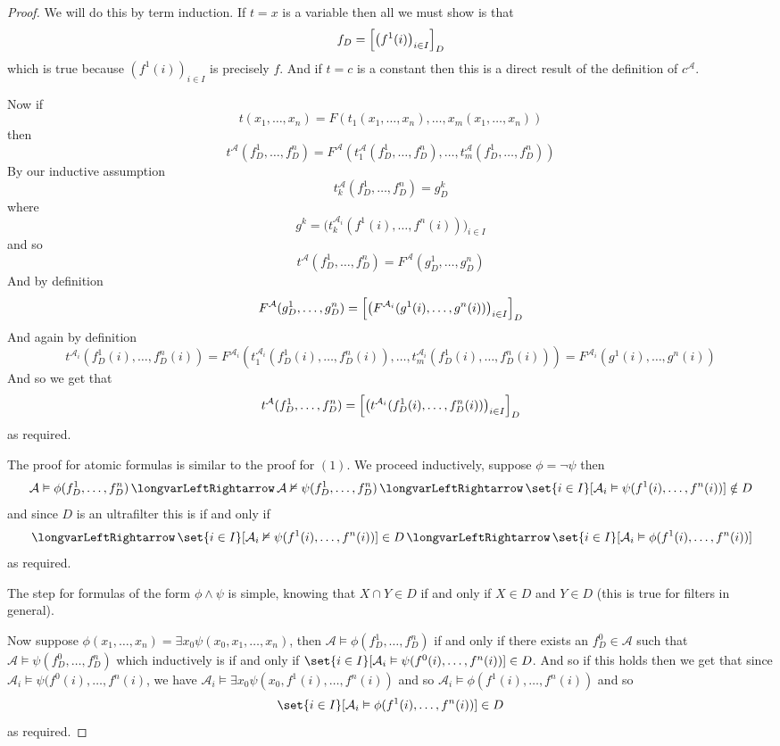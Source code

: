 \documentclass[10pt]{article}
\def\iff{\,\longvarLeftRightarrow\,}
\def\mA{\mathcal{A}}
\begin{document}
\begin{proof}

    \benum
        \item We will do this by term induction.
        If $t=x$ is a variable then all we must show is that
        \[ f_D = \Bigl[\bigl(f^1(i)\bigr)_{i\in I}\Bigr]_D \]
        which is true because $(f^1(i))_{i\in I}$ is precisely $f$.
        And if $t=c$ is a constant then this is a direct result of the definition of $c^\mA$.

        Now if
        \[ t(x_1,\dots,x_n) = F(t_1(x_1,\dots,x_n),\dots,x_m(x_1,\dots,x_n)) \]
        then
        \[ t^\mA(f^1_D,\dots,f^n_D) = F^\mA(t_1^\mA(f_D^1,\dots,f_D^n),\dots,t_m^\mA(f_D^1,\dots,f_D^n)) \]
        By our inductive assumption
        \[ t_k^\mA(f_D^1,\dots,f_D^n) = g^k_D \]
        where
        \[ g^k = \bigl(t_k^{\mA_i}(f^1(i),\dots,f^n(i))\bigr)_{i\in I} \]
        and so
        \[ t^\mA(f^1_D,\dots,f^n_D) = F^\mA(g_D^1,\dots,g_D^n) \]
        And by definition
        \[ F^\mA(g_D^1,\dots,g_D^n) = \Bigl[\bigl(F^{\mA_i}(g^1(i),\dots,g^n(i))\bigr)_{i\in I}\Bigr]_D \]
        And again by definition
        \[ t^{\mA_i}(f_D^1(i),\dots,f_D^n(i)) = F^{\mA_i}(t_1^{\mA_i}(f_D^1(i),\dots,f_D^n(i)),\dots,t_m^{\mA_i}(f_D^1(i),\dots,f_D^n(i))) = F^{\mA_i}(g^1(i),\dots,g^n(i)) \]
        And so we get that
        \[ t^\mA(f^1_D,\dots,f^n_D) = \Bigl[\bigl(t^{\mA_i}(f_D^1(i),\dots,f_D^n(i))\bigr)_{i\in I}\Bigr]_D \]
        as required.

        \item The proof for atomic formulas is similar to the proof for $(1)$.
        We proceed inductively, suppose $\phi=\neg\psi$ then
        \[ \mA\vDash\phi(f^1_D,\dots,f^n_D) \iff \mA\nvDash\psi(f^1_D,\dots,f^n_D) \iff \set{i\in I}[\mA_i\vDash\psi(f^1(i),\dots,f^n(i))] \notin D \]
        and since $D$ is an ultrafilter this is if and only if
        \[ \iff \set{i\in I}[\mA_i\nvDash\psi(f^1(i),\dots,f^n(i))] \in D \iff \set{i\in I}[\mA_i\vDash\phi(f^1(i),\dots,f^n(i))] \]
        as required.

        The step for formulas of the form $\phi\land\psi$ is simple, knowing that $X\cap Y\in D$ if and only if $X\in D$ and $Y\in D$ (this is true for filters in general).

        Now suppose $\phi(x_1,\dots,x_n)=\exists x_0\psi(x_0,x_1,\dots,x_n)$, then $\mA\vDash\phi(f^1_D,\dots,f^n_D)$ if and only if there exists an $f^0_D\in\mA$ such that
        $\mA\vDash\psi(f^0_D,\dots,f^n_D)$ which inductively is if and only if $\set{i\in I}[\mA_i\vDash\psi(f^0(i),\dots,f^n(i))]\in D$.
        And so if this holds then we get that since $\mA_i\vDash\psi(f^0(i),\dots,f^n(i)$, we have $\mA_i\vDash\exists x_0\psi(x_0,f^1(i),\dots,f^n(i))$ and so $\mA_i\vDash\phi(f^1(i),\dots,f^n(i))$ and so
        \[ \set{i\in I}[\mA_i\vDash\phi(f^1(i),\dots,f^n(i))] \in D \]
        as required.


\end{proof}
\end{document}
